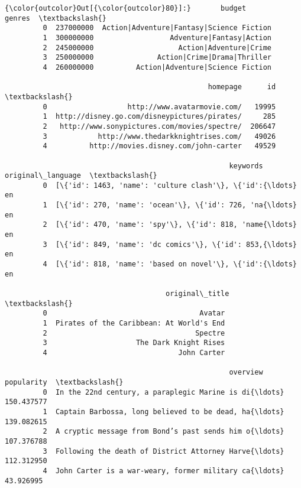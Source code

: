 \documentclass[11pt]{article}
\begin{document}
\begin{Verbatim}[commandchars=\\\{\}]
{\color{outcolor}Out[{\color{outcolor}80}]:}       budget                                    genres  \textbackslash{}
         0  237000000  Action|Adventure|Fantasy|Science Fiction   
         1  300000000                  Adventure|Fantasy|Action   
         2  245000000                    Action|Adventure|Crime   
         3  250000000               Action|Crime|Drama|Thriller   
         4  260000000          Action|Adventure|Science Fiction   
         
                                                homepage      id  \textbackslash{}
         0                   http://www.avatarmovie.com/   19995   
         1  http://disney.go.com/disneypictures/pirates/     285   
         2   http://www.sonypictures.com/movies/spectre/  206647   
         3            http://www.thedarkknightrises.com/   49026   
         4          http://movies.disney.com/john-carter   49529   
         
                                                     keywords original\_language  \textbackslash{}
         0  [\{'id': 1463, 'name': 'culture clash'\}, \{'id':{\ldots}                en   
         1  [\{'id': 270, 'name': 'ocean'\}, \{'id': 726, 'na{\ldots}                en   
         2  [\{'id': 470, 'name': 'spy'\}, \{'id': 818, 'name{\ldots}                en   
         3  [\{'id': 849, 'name': 'dc comics'\}, \{'id': 853,{\ldots}                en   
         4  [\{'id': 818, 'name': 'based on novel'\}, \{'id':{\ldots}                en   
         
                                      original\_title  \textbackslash{}
         0                                    Avatar   
         1  Pirates of the Caribbean: At World's End   
         2                                   Spectre   
         3                     The Dark Knight Rises   
         4                               John Carter   
         
                                                     overview  popularity  \textbackslash{}
         0  In the 22nd century, a paraplegic Marine is di{\ldots}  150.437577   
         1  Captain Barbossa, long believed to be dead, ha{\ldots}  139.082615   
         2  A cryptic message from Bond’s past sends him o{\ldots}  107.376788   
         3  Following the death of District Attorney Harve{\ldots}  112.312950   
         4  John Carter is a war-weary, former military ca{\ldots}   43.926995   
         

\end{Verbatim}
\end{document}
